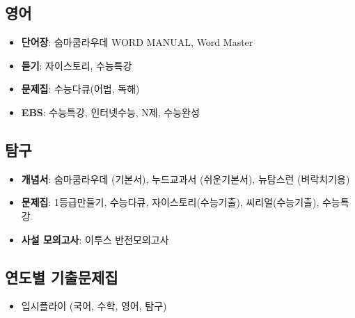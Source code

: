 \documentclass[final]{IEEEphot}
\begin{document}
\subsection*{영어}

\vspace{0.1cm}

\begin{itemize}
 \item \textbf{단어장}: 숨마쿰라우데 WORD MANUAL, Word Master
 \item \textbf{듣기}: 자이스토리, 수능특강
 \item \textbf{문제집}: 수능다큐(어법, 독해)
 \item \textbf{EBS}: 수능특강, 인터넷수능, N제, 수능완성
\end{itemize}

\subsection*{탐구}

\vspace{0.1cm}

\begin{itemize}
 \item \textbf{개념서}: 숨마쿰라우데 (기본서), 누드교과서 (쉬운기본서), 뉴탐스런 (벼락치기용)
 \item \textbf{문제집}: 1등급만들기, 수능다큐, 자이스토리(수능기출), 씨리얼(수능기출), 수능특강
 \item \textbf{사설 모의고사}: 이투스 반전모의고사
\end{itemize}

\subsection*{연도별 기출문제집}

\vspace{0.1cm}

\begin{itemize}
 \item 입시플라이 (국어, 수학, 영어, 탐구)
\end{itemize}


%
%


\end{document}

